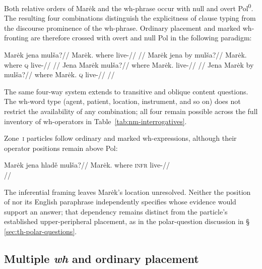 Both relative orders of Marėk and the wh-phrase occur with null and overt
Pol\textsuperscript{0}. The resulting four combinations distinguish the
explicitness of clause typing from the discourse prominence of the wh-phrase.
Ordinary placement and marked wh-fronting are therefore crossed with
overt and null Pol in the following paradigm:

\pex\label{ex:wh-four-combinations}
\a
\begingl
\gla Marėk jena mulša?//
\glb Marėk.\Dir{} where live-\Cont{}//
\glft {} //
\endgl
\a
\begingl
\gla Marėk jena by mulša?//
\glb Marėk.\Dir{} where \textsc{q} live-\Cont{}//
\glft {} //
\endgl
\a
\begingl
\gla Jena Marėk mulša?//
\glb where Marėk.\Dir{} live-\Cont{}//
\glft {} //
\endgl
\a
\begingl
\gla Jena Marėk by mulša?//
\glb where Marėk.\Dir{} \textsc{q} live-\Cont{}//
\glft {} //
\endgl
\xe

The same four-way system extends to transitive and oblique content
questions. The wh-word type (agent, patient, location, instrument, and so on)
does not restrict the availability of any combination; all four remain possible
across the full inventory of wh-operators in Table~\ref{tab:nm-interrogatives}.

Zone~\textsc{i} particles follow ordinary and marked wh-expressions,
 although their operator positions remain above Pol:

\pex
\a
\begingl
\gla Marėk jena hladě mulša?//
\glb Marėk.\Dir{} where \textsc{infr} live-\Cont{}//
\glft {}\\
      //
\endgl
\xe

The inferential framing leaves Marėk's location unresolved. Neither the
position of  nor its English paraphrase independently
specifies whose evidence would support an answer; that dependency remains
distinct from the particle's established upper-peripheral placement, as in
the polar-question discussion in §\,\ref{sec:th-polar-questions}.

\subsection{Multiple \textit{wh} and ordinary placement}
\label{sec:th-multiple-wh}

